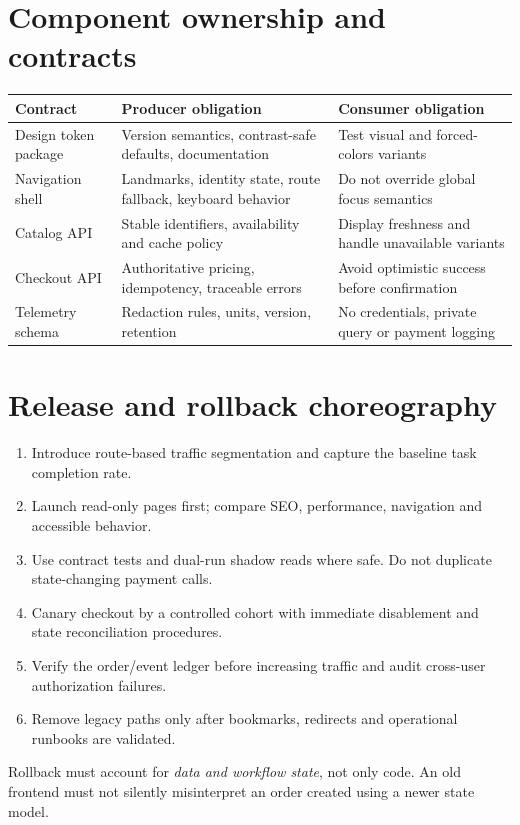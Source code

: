 \documentclass[11pt]{article}
\begin{document}
\section{Component ownership and contracts}

\begin{tabularx}{\linewidth}{@{}>{\raggedright\arraybackslash}p{30mm}>{\raggedright\arraybackslash}X>{\raggedright\arraybackslash}X@{}}\toprule
Contract & Producer obligation & Consumer obligation\\\midrule
Design token package & Version semantics, contrast-safe defaults, documentation & Test visual and forced-colors variants\\
Navigation shell & Landmarks, identity state, route fallback, keyboard behavior & Do not override global focus semantics\\
Catalog API & Stable identifiers, availability and cache policy & Display freshness and handle unavailable variants\\
Checkout API & Authoritative pricing, idempotency, traceable errors & Avoid optimistic success before confirmation\\
Telemetry schema & Redaction rules, units, version, retention & No credentials, private query or payment logging\\
\bottomrule\end{tabularx}

\section{Release and rollback choreography}

\begin{enumerate}
\item Introduce route-based traffic segmentation and capture the baseline task completion rate.
\item Launch read-only pages first; compare SEO, performance, navigation and accessible behavior.
\item Use contract tests and dual-run shadow reads where safe. Do not duplicate state-changing payment calls.
\item Canary checkout by a controlled cohort with immediate disablement and state reconciliation procedures.
\item Verify the order/event ledger before increasing traffic and audit cross-user authorization failures.
\item Remove legacy paths only after bookmarks, redirects and operational runbooks are validated.
\end{enumerate}
\begin{decisionbox}Rollback must account for \emph{data and workflow state}, not only code. An old frontend must not silently misinterpret an order created using a newer state model.\end{decisionbox}
\end{document}
